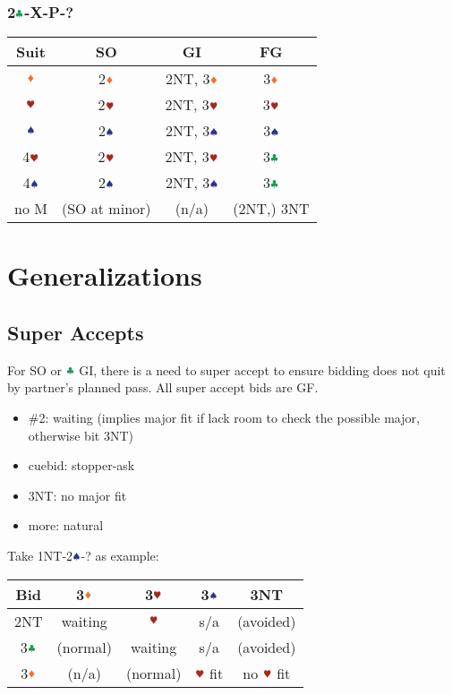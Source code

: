 \documentclass{article}
\newcommand*{\ccc}{\textcolor{ForestGreen}{\clubsuit}}
\newcommand*{\ddd}{\textcolor{Orange}{\vardiamondsuit}}
\newcommand*{\hhh}{\textcolor{Mahogany}{\varheartsuit}}
\newcommand*{\sss}{\textcolor{Blue}{\spadesuit}}
\begin{document}
\begin{multicols}{2}
\subsubsection{2$\ccc$-X-P-?}
\begin{tabular}{c|c|c|c}
    \hline
    Suit & SO & GI & FG \\ \hline\hline
    $\ddd$ & 2$\ddd$ & 2NT, 3$\ddd$ & 3$\ddd$ \\ \hline
    $\hhh$ & 2$\hhh$ & 2NT, 3$\hhh$ & 3$\hhh$ \\ \hline
    $\sss$ & 2$\sss$ & 2NT, 3$\sss$ & 3$\sss$ \\ \hline
    4$\hhh$ & 2$\hhh$ & 2NT, 3$\hhh$ & 3$\ccc$ \\ \hline
    4$\sss$ & 2$\sss$ & 2NT, 3$\sss$ & 3$\ccc$ \\ \hline
    no M & (SO at minor) & (n/a) & (2NT,) 3NT \\ \hline
\end{tabular}

\section{Generalizations}
\subsection{Super Accepts}
For SO or $\ccc$ GI, there is a need to super accept to ensure bidding does not quit by partner's planned pass. All super accept bids are GF.
\begin{itemize}
    \item \#2: waiting (implies major fit if lack room to check the possible major, otherwise bit 3NT)
    \item cuebid: stopper-ask
    \item 3NT: no major fit
    \item more: natural
\end{itemize}

\noindent Take 1NT-2$\sss$-? as example: \\
\begin{tabular}{c|c|c|c|c}
    \hline
    Bid & 3$\ddd$ & 3$\hhh$ & 3$\sss$ & 3NT \\ \hline\hline
    2NT & waiting & $\hhh$ & s/a & (avoided) \\ \hline
    3$\ccc$ & (normal) & waiting & s/a & (avoided) \\ \hline
    3$\ddd$ & (n/a) & (normal) & $\hhh$ fit & no $\hhh$ fit \\ \hline
\end{tabular}


\end{multicols}
\end{document}
